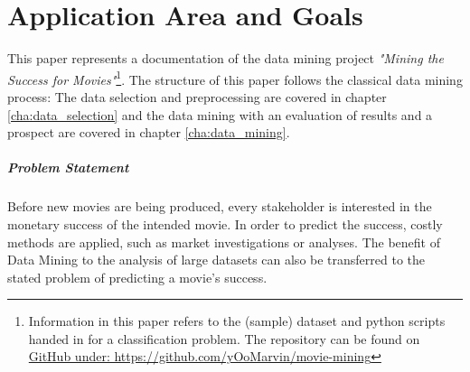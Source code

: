 \begingroup
\renewcommand{\cleardoublepage}{}
\renewcommand{\clearpage}{}
\chapter{Application Area and Goals}\label{chap:area_goals}
\endgroup


This paper represents a documentation of the data mining project \textit{"Mining the Success for Movies"}\footnote{Information in this paper refers to the (sample) dataset and python scripts handed in for a classification problem. The repository can be found on \hyperref{https://github.com/yOoMarvin/movie-mining}{external}{github}{GitHub under: https://github.com/yOoMarvin/movie-mining}}. The structure of this paper follows the classical data mining process: The data selection and preprocessing are covered in chapter \ref{cha:data_selection} and the data mining with an evaluation of results and a prospect are covered in chapter \ref{cha:data_mining}.


\paragraph{Problem Statement}
Before new movies are being produced, every stakeholder is interested in the monetary success of the intended movie. In order to predict the success, costly methods are applied, such as market investigations or analyses. The benefit of Data Mining to the analysis of large datasets can also be transferred to the stated problem of predicting a movie's success. %

